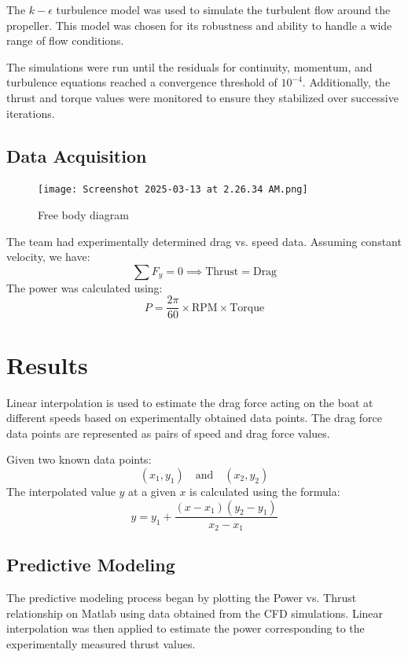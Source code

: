 \documentclass{article}
\begin{document}
The \( k-\epsilon \) turbulence model was used to simulate the turbulent flow around the propeller. This model was chosen for its robustness and ability to handle a wide range of flow conditions.

The simulations were run until the residuals for continuity, momentum, and turbulence equations reached a convergence threshold of \( 10^{-4} \). Additionally, the thrust and torque values were monitored to ensure they stabilized over successive iterations.

\subsection{Data Acquisition}
\begin{figure}[h!]
    \centering
    \texttt{[image: Screenshot 2025-03-13 at 2.26.34 AM.png]}
    \caption{Free body diagram}
    \label{fig:free_body_diagram}
\end{figure}

The team had experimentally determined drag vs. speed data. Assuming constant velocity, we have:
\[
\sum F_y = 0 \implies \text{Thrust} = \text{Drag}
\]
The power was calculated using:
\[
P = \frac{2\pi}{60} \times \text{RPM} \times \text{Torque}
\]



\section{Results}
Linear interpolation is used to estimate the drag force acting on the boat at different speeds based on experimentally obtained data points. The drag force data points are represented as pairs of speed and drag force values.

Given two known data points:
\[
(x_1, y_1) \quad \text{and} \quad (x_2, y_2)
\]
The interpolated value \( y \) at a given \( x \) is calculated using the formula:
\[
y = y_1 + \frac{(x - x_1)(y_2 - y_1)}{x_2 - x_1}
\]


\subsection{Predictive Modeling}

The predictive modeling process began by plotting the Power vs. Thrust relationship on Matlab using data obtained from the CFD simulations. Linear interpolation was then applied to estimate the power corresponding to the experimentally measured thrust values. 
\end{document}

